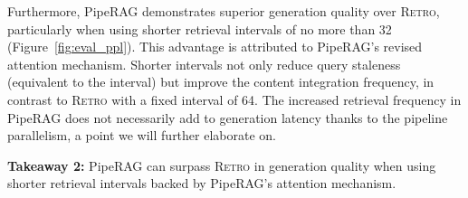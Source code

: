 \begin{table*}
\centering 

\caption{Performance-driven retrieval (S3) facilitates latency comparable to non-retrieval models while significantly reducing perplexity. Values in parentheses indicate the difference compared to the baseline model without retrieval (lower latency and perplexity are better).} 

\vspace{0.5em}

\label{tab:dynamic_nprobe} 

\end{table*}

Furthermore, PipeRAG demonstrates superior generation quality over \textsc{Retro}, particularly when using shorter retrieval intervals of no more than 32 (Figure~\ref{fig:eval_ppl}). This advantage is attributed to PipeRAG's revised attention mechanism. Shorter intervals not only reduce query staleness (equivalent to the interval) but improve the content integration frequency, in contrast to \textsc{Retro} with a fixed interval of 64. The increased retrieval frequency in PipeRAG does not necessarily add to generation latency thanks to the pipeline parallelism, a point we will further elaborate on.

\begin{tcolorbox}[
    enhanced,
    arc=2mm, %
    outer arc=2mm, %
    boxrule=0.8pt, %
    colframe=black, %
    colback=white, %
    boxsep=0pt, %
    drop shadow southeast, %
]

\textbf{Takeaway 2:} PipeRAG can surpass \textsc{Retro} in generation quality when using shorter retrieval intervals backed by PipeRAG's attention mechanism.
\end{tcolorbox}

